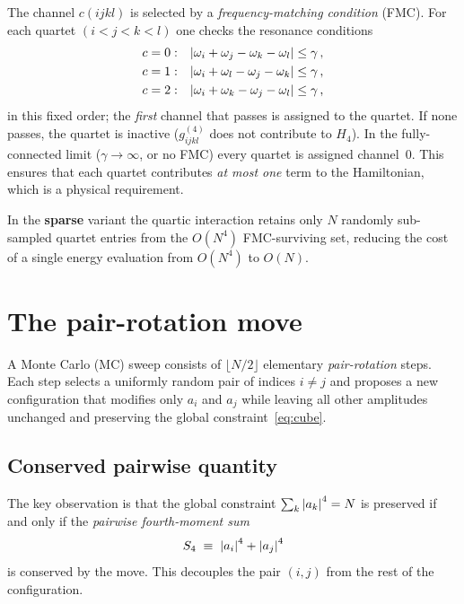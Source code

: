 \documentclass[11pt,a4paper]{article}
\newcommand{\ai}{a_i}
\newcommand{\aj}{a_j}
\newcommand{\Sfour}{S_4}
\begin{document}
The channel $c(ijkl)$ is selected by a \emph{frequency-matching condition}
(FMC).  For each quartet $(i<j<k<l)$ one checks the resonance conditions
\begin{alignat}{2}
  c=0:&\quad \abs{\omega_i+\omega_j-\omega_k-\omega_l} \le \gamma\,,\notag\\
  c=1:&\quad \abs{\omega_i+\omega_l-\omega_j-\omega_k} \le \gamma\,,\notag\\
  c=2:&\quad \abs{\omega_i+\omega_k-\omega_j-\omega_l} \le \gamma\,,\notag
\end{alignat}
in this fixed order; the \emph{first} channel that passes is assigned to
the quartet.  If none passes, the quartet is inactive ($g^{(4)}_{ijkl}$
does not contribute to $H_4$).  In the fully-connected limit
($\gamma\to\infty$, or no FMC) every quartet is assigned channel~$0$.
This ensures that each quartet contributes \emph{at most one} term to the
Hamiltonian, which is a physical requirement.

In the \textbf{sparse} variant the quartic interaction retains only $N$
randomly sub-sampled quartet entries from the $O(N^4)$ FMC-surviving set,
reducing the cost of a single energy evaluation from $O(N^4)$ to $O(N)$.

\section{The pair-rotation move}

A Monte Carlo (MC) sweep consists of $\lfloor N/2\rfloor$ elementary
\emph{pair-rotation} steps.
Each step selects a uniformly random pair of indices $i\neq j$ and proposes
a new configuration that modifies only $a_i$ and $a_j$ while leaving all
other amplitudes unchanged and preserving the global constraint~\eqref{eq:cube}.

\subsection{Conserved pairwise quantity}

The key observation is that the global constraint $\sum_k\abs{a_k}^4 = N$
is preserved if and only if the \emph{pairwise fourth-moment sum}
\begin{equation}\label{eq:S4}
  \Sfour \;\equiv\; \abs{\ai}^4 + \abs{\aj}^4
\end{equation}
is conserved by the move.  This decouples the pair $(i,j)$ from the rest of
the configuration.
\end{document}
